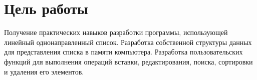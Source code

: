 \section*{Цель работы}

Получение практических навыков разработки программы,
использующей линейный однонаправленный список.
Разработка собственной
структуры данных для представления списка в памяти компьютера.
Разработка пользовательских функций для выполнения операций вставки,
редактирования, поиска, сортировки и удаления его элементов.